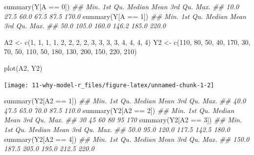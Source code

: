 \documentclass[
  10pt,
  a4paper,
]{book}
\newenvironment{Shaded}{\begin{snugshade}}{\end{snugshade}}
\newcommand{\DecValTok}[1]{\textcolor[rgb]{0.68,0.00,0.00}{#1}}
\newcommand{\DocumentationTok}[1]{\textcolor[rgb]{0.37,0.37,0.37}{\textit{#1}}}
\newcommand{\FunctionTok}[1]{\textcolor[rgb]{0.28,0.35,0.67}{#1}}
\newcommand{\NormalTok}[1]{\textcolor[rgb]{0.00,0.46,0.62}{#1}}
\newcommand{\OtherTok}[1]{\textcolor[rgb]{0.00,0.46,0.62}{#1}}
\newcommand{\SpecialCharTok}[1]{\textcolor[rgb]{0.37,0.37,0.37}{#1}}
\begin{document}
\begin{Shaded}
\begin{Highlighting}[]
\FunctionTok{summary}\NormalTok{(Y[A }\SpecialCharTok{==} \DecValTok{0}\NormalTok{])}
\DocumentationTok{\#\#    Min. 1st Qu.  Median    Mean 3rd Qu.    Max. }
\DocumentationTok{\#\#    10.0    27.5    60.0    67.5    87.5   170.0}
\FunctionTok{summary}\NormalTok{(Y[A }\SpecialCharTok{==} \DecValTok{1}\NormalTok{])}
\DocumentationTok{\#\#    Min. 1st Qu.  Median    Mean 3rd Qu.    Max. }
\DocumentationTok{\#\#    50.0   105.0   160.0   146.2   185.0   220.0}

\NormalTok{A2 }\OtherTok{\textless{}{-}} \FunctionTok{c}\NormalTok{(}\DecValTok{1}\NormalTok{, }\DecValTok{1}\NormalTok{, }\DecValTok{1}\NormalTok{, }\DecValTok{1}\NormalTok{, }\DecValTok{2}\NormalTok{, }\DecValTok{2}\NormalTok{, }\DecValTok{2}\NormalTok{, }\DecValTok{2}\NormalTok{, }\DecValTok{3}\NormalTok{, }\DecValTok{3}\NormalTok{, }\DecValTok{3}\NormalTok{, }\DecValTok{3}\NormalTok{, }\DecValTok{4}\NormalTok{, }\DecValTok{4}\NormalTok{, }\DecValTok{4}\NormalTok{, }\DecValTok{4}\NormalTok{)}
\NormalTok{Y2 }\OtherTok{\textless{}{-}} \FunctionTok{c}\NormalTok{(}\DecValTok{110}\NormalTok{, }\DecValTok{80}\NormalTok{, }\DecValTok{50}\NormalTok{, }\DecValTok{40}\NormalTok{, }\DecValTok{170}\NormalTok{, }\DecValTok{30}\NormalTok{, }\DecValTok{70}\NormalTok{, }\DecValTok{50}\NormalTok{, }\DecValTok{110}\NormalTok{, }\DecValTok{50}\NormalTok{, }\DecValTok{180}\NormalTok{,}
        \DecValTok{130}\NormalTok{, }\DecValTok{200}\NormalTok{, }\DecValTok{150}\NormalTok{, }\DecValTok{220}\NormalTok{, }\DecValTok{210}\NormalTok{)}

\FunctionTok{plot}\NormalTok{(A2, Y2)}
\end{Highlighting}
\end{Shaded}

\begin{center}\texttt{[image: 11-why-model-r\_files/figure-latex/unnamed-chunk-1-2]} \end{center}

\begin{Shaded}
\begin{Highlighting}[]
\FunctionTok{summary}\NormalTok{(Y2[A2 }\SpecialCharTok{==} \DecValTok{1}\NormalTok{])}
\DocumentationTok{\#\#    Min. 1st Qu.  Median    Mean 3rd Qu.    Max. }
\DocumentationTok{\#\#    40.0    47.5    65.0    70.0    87.5   110.0}
\FunctionTok{summary}\NormalTok{(Y2[A2 }\SpecialCharTok{==} \DecValTok{2}\NormalTok{])}
\DocumentationTok{\#\#    Min. 1st Qu.  Median    Mean 3rd Qu.    Max. }
\DocumentationTok{\#\#      30      45      60      80      95     170}
\FunctionTok{summary}\NormalTok{(Y2[A2 }\SpecialCharTok{==} \DecValTok{3}\NormalTok{])}
\DocumentationTok{\#\#    Min. 1st Qu.  Median    Mean 3rd Qu.    Max. }
\DocumentationTok{\#\#    50.0    95.0   120.0   117.5   142.5   180.0}
\FunctionTok{summary}\NormalTok{(Y2[A2 }\SpecialCharTok{==} \DecValTok{4}\NormalTok{])}
\DocumentationTok{\#\#    Min. 1st Qu.  Median    Mean 3rd Qu.    Max. }
\DocumentationTok{\#\#   150.0   187.5   205.0   195.0   212.5   220.0}
\end{Highlighting}
\end{Shaded}
\end{document}
